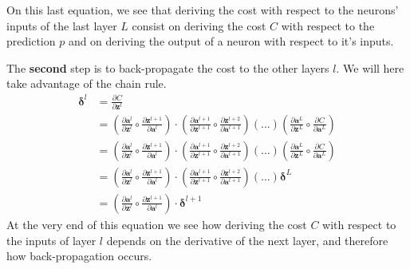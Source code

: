 			On this last equation, we see that deriving the cost with respect to the neurons' inputs of the last layer $L$ consist on deriving the cost $C$ with respect to the prediction $p$ and on deriving the output of a neuron with respect to it's inputs. 

			The \textbf{second} step is to back-propagate the cost to the other layers $l$. We will here take advantage of the chain rule. 
			\begin{equation}
				\begin{split}
					\boldsymbol{\delta}^l
					&=  \frac{\partial C}{\partial \boldsymbol{z}^l } \\
					&=	\left(\frac{\partial \boldsymbol{a}^l }{\partial \boldsymbol{z}^l }  					\circ\frac{\partial \boldsymbol{z}^{l+1} }{\partial \boldsymbol{a}^l } \right) 	\cdot
					\left(\frac{\partial \boldsymbol{a}^{l+1} }{\partial \boldsymbol{z}^{l+1} }  		\circ\frac{\partial \boldsymbol{z}^{l+2}}{\partial \boldsymbol{a}^{l+1} }\right)  (...)
					\left(\frac{\partial \boldsymbol{a}^L }{\partial \boldsymbol{z}^L } 		 		\circ\frac{\partial C}{\partial \boldsymbol{a}^L }\right) \\
					&=  \left(\frac{\partial \boldsymbol{a}^l }{\partial \boldsymbol{z}^l }  					\circ\frac{\partial \boldsymbol{z}^{l+1} }{\partial \boldsymbol{a}^l }  \right) \cdot
						\left( \frac{\partial \boldsymbol{a}^{l+1} }{\partial \boldsymbol{z}^{l+1} }  	\circ\frac{\partial \boldsymbol{z}^{l+2}}{\partial \boldsymbol{a}^{l+1} }\right) (...)
						\left( \frac{\partial \boldsymbol{a}^L }{\partial \boldsymbol{z}^L }			\circ\frac{\partial C}{\partial \boldsymbol{a}^L }\right) \\
					&= 	\left(\frac{\partial \boldsymbol{a}^l }{\partial \boldsymbol{z}^l }   				\circ\frac{\partial \boldsymbol{z}^{l+1} }{\partial \boldsymbol{a}^l } \right) 		\cdot
						\left( \frac{\partial \boldsymbol{a}^{l+1} }{\partial \boldsymbol{z}^{l+1} }  	\circ\frac{\partial \boldsymbol{z}^{l+2}}{\partial \boldsymbol{a}^{l+1} }\right) (...) 
						\boldsymbol{\delta}^{L}\\
					&= 	\left(\frac{\partial \boldsymbol{a}^l }{\partial \boldsymbol{z}^l }  					\circ\frac{\partial \boldsymbol{z}^{l+1} }{\partial \boldsymbol{a}^l } \right) 	\cdot
						\boldsymbol{\delta}^{l+1}
				\end{split}
			\end{equation}
			At the very end of this equation we see how deriving the cost $C$ with respect to the inputs of layer $l$ depends on the derivative of the next layer, and therefore how back-propagation occurs.


